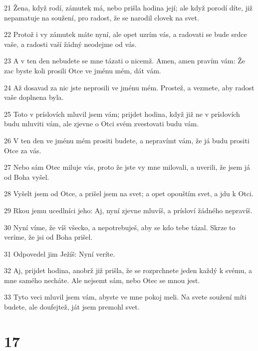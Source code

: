\par 21 Žena, když rodí, zámutek má, nebo prišla hodina její; ale když porodí díte, již nepamatuje na soužení, pro radost, že se narodil clovek na svet.
\par 22 Protož i vy zámutek máte nyní, ale opet uzrím vás, a radovati se bude srdce vaše, a radosti vaší žádný neodejme od vás.
\par 23 A v ten den nebudete se mne tázati o nicemž. Amen, amen pravím vám: Že zac byste koli prosili Otce ve jménu mém, dát vám.
\par 24 Až dosavad za nic jste neprosili ve jménu mém. Prostež, a vezmete, aby radost vaše doplnena byla.
\par 25 Toto v príslovích mluvil jsem vám; prijdet hodina, když již ne v príslovích budu mluviti vám, ale zjevne o Otci svém zvestovati budu vám.
\par 26 V ten den ve jménu mém prositi budete, a nepravímt vám, že já budu prositi Otce za vás.
\par 27 Nebo sám Otec miluje vás, proto že jste vy mne milovali, a uverili, že jsem já od Boha vyšel.
\par 28 Vyšelt jsem od Otce, a prišel jsem na svet; a opet opouštím svet, a jdu k Otci.
\par 29 Rkou jemu ucedlníci jeho: Aj, nyní zjevne mluvíš, a prísloví žádného nepravíš.
\par 30 Nyní víme, že víš všecko, a nepotrebuješ, aby se kdo tebe tázal. Skrze to veríme, že jsi od Boha prišel.
\par 31 Odpovedel jim Ježíš: Nyní veríte.
\par 32 Aj, prijdet hodina, anobrž již prišla, že se rozprchnete jeden každý k svému, a mne samého necháte. Ale nejsemt sám, nebo Otec se mnou jest.
\par 33 Tyto veci mluvil jsem vám, abyste ve mne pokoj meli. Na svete soužení míti budete, ale doufejtež, ját jsem premohl svet.

\chapter{17}

